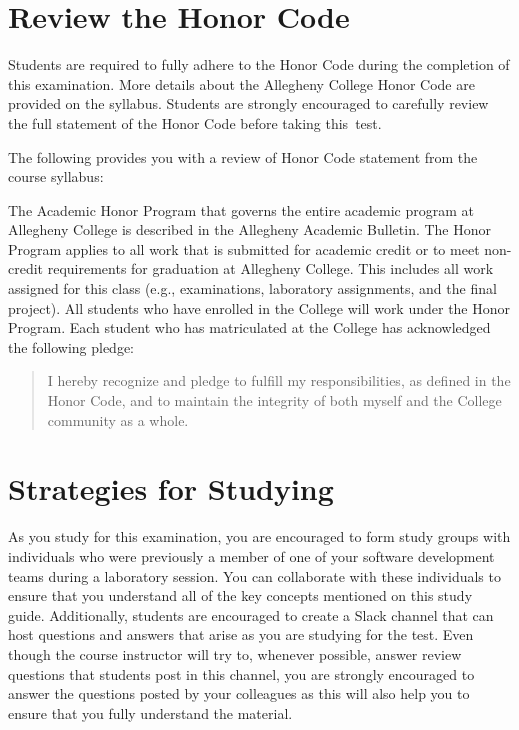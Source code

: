 \vspace*{-.1in}
\section*{Review the Honor Code}
\vspace*{-.06in}

\noindent Students are required to fully adhere to the Honor Code during the completion of this examination. More
details about the Allegheny College Honor Code are provided on the syllabus. Students are strongly encouraged to
carefully review the full statement of the Honor Code before taking \mbox{this test}.

\noindent The following provides you with a review of Honor Code statement from the course syllabus:

The Academic Honor Program that governs the entire academic program at Allegheny College is described in the Allegheny
Academic Bulletin.  The Honor Program applies to all work that is submitted for academic credit or to meet non-credit
requirements for graduation at Allegheny College.  This includes all work assigned for this class (e.g., examinations,
laboratory assignments, and the final project).  All students who have enrolled in the College will work under the Honor
Program.  Each student who has matriculated at the College has acknowledged the following pledge:

\vspace*{-.11in}
\begin{quote}
  I hereby recognize and pledge to fulfill my responsibilities, as defined in the Honor Code, and to maintain the
  integrity of both myself and the College community as a whole.
\end{quote}
\vspace*{-.11in}

\vspace*{-.15in}
\section*{Strategies for Studying}
\vspace*{-.05in}

As you study for this examination, you are encouraged to form study groups with individuals who were previously a
member of one of your software development teams during a laboratory session. You can collaborate with these individuals
to ensure that you understand all of the key concepts mentioned on this study guide. Additionally, students are
encouraged to create a Slack channel that can host questions and answers that arise as you are studying for the test.
Even though the course instructor will try to, whenever possible, answer review questions that students post in this
channel, you are strongly encouraged to answer the questions posted by your colleagues as this will also help you to
ensure that you fully understand the material.

